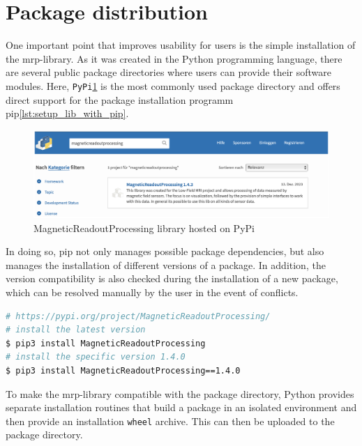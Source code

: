 \hypertarget{package-distribution}{%
\section{Package distribution}\label{package-distribution}}

One important point that improves usability for users is the simple
installation of the \gls{mrp}-library. As it was created in the Python
programming language, there are several public package directories where
users can provide their software modules. Here,
\passthrough{\lstinline!PyPi!}\cite{PyPI}\ref{MagneticReadoutProcessing_library_hosted_on_PyPi.png}\cite{MagneticReadoutProcessingPyPI}
is the most commonly used package directory and offers direct support
for the package installation programm
\gls{pip}\ref{lst:setup_lib_with_pip}.

\begin{figure}
\centering
\includegraphics{./generated_images/border_MagneticReadoutProcessing_library_hosted_on_PyPi.png}
\caption{MagneticReadoutProcessing library hosted on PyPi
\label{MagneticReadoutProcessing_library_hosted_on_PyPi.png}}
\end{figure}

In doing so, \gls{pip} not only manages possible package dependencies,
but also manages the installation of different versions of a package. In
addition, the version compatibility is also checked during the
installation of a new package, which can be resolved manually by the
user in the event of conflicts.

\begin{lstlisting}[language=bash, caption={Bash commands to install the MagneticReadoutProcessing (+mrp)-library using pip}, label=lst:setup_lib_with_pip]
# https://pypi.org/project/MagneticReadoutProcessing/
# install the latest version
$ pip3 install MagneticReadoutProcessing
# install the specific version 1.4.0
$ pip3 install MagneticReadoutProcessing==1.4.0
\end{lstlisting}

To make the \gls{mrp}-library compatible with the package directory,
Python provides separate installation routines that build a package in
an isolated environment and then provide an installation
\passthrough{\lstinline!wheel!} archive. This can then be uploaded to
the package directory.

